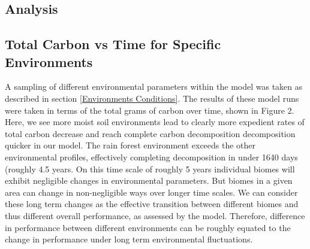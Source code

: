 \documentclass[12pt]{article}
\begin{document}
\begin{multicols}{2}


\section{Analysis}


\subsection{Total Carbon vs Time for Specific Environments} %
A sampling of different environmental parameters within the model was taken as described in section \ref{Environments Conditions}. The results of these model runs were taken in terms of the total grams of carbon over time, shown in Figure 2. Here, we see more moist soil environments lead to clearly more expedient rates of total carbon decrease and reach complete carbon decomposition decomposition quicker in our model. The rain forest environment exceeds the other environmental profiles, effectively completing decomposition in under 1640 days (roughly 4.5 years. On this time scale of roughly 5 years individual biomes will exhibit negligible changes in environmental parameters. But biomes in a given area can change in non-negligible ways over longer time scales. We can consider these long term changes as the effective transition between different biomes and thus different overall performance, as assessed by the model. Therefore, difference in performance between different environments can be roughly equated to the change in performance under long term environmental fluctuations. 

\end{multicols}
\end{document}
